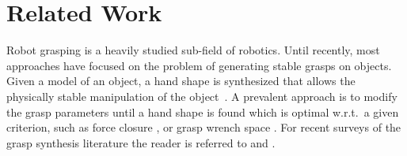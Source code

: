 \documentclass{aamas2015}
\begin{document}
%	
%	
\newpage
\section{Related Work}
Robot grasping is a heavily studied sub-field of robotics.
Until recently, most approaches have focused on the problem 
of generating stable grasps on objects. Given a model of an object, a hand shape is synthesized 
that allows the physically stable manipulation of the object~\cite{Klank2009, Kragic2001}.
A prevalent approach is to modify the grasp parameters 
until a hand shape is found which is optimal w.r.t.~a given criterion, such as force closure \cite{nguyen}, or grasp wrench space \cite{Borst}. For recent surveys 
of the grasp synthesis literature the reader is referred to \cite{Bohg2014} and \cite{Sahbani2012}.
\end{document}
